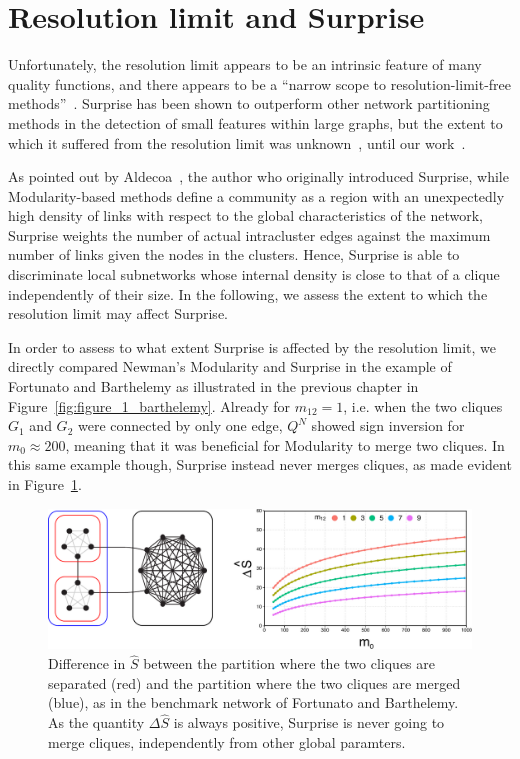 \section{Resolution limit and Surprise}
Unfortunately, the resolution limit appears to be an intrinsic feature of many quality functions, and there appears to be a ``narrow scope to resolution-limit-free methods''~\cite{traag2015}.  
Surprise has been shown to outperform other network partitioning methods in the detection of small features within large graphs, but the extent to which it suffered from the resolution limit was unknown~\cite{aldecoa2011,aldecoa2013}, until our work~\cite{nicolini2016}.

As pointed out by Aldecoa~\cite{aldecoa2011}, the author who originally introduced Surprise, while Modularity-based methods define a community as a region with an unexpectedly high density of links with respect to the global characteristics of the network, Surprise weights the number of actual intracluster edges against the maximum number of links given the nodes in the clusters.
Hence, Surprise is able to discriminate local subnetworks whose internal density is close to that of a clique independently of their size.
In the following, we assess the extent to which the resolution limit may affect Surprise.

In order to assess to what extent Surprise is affected by the resolution limit, we directly compared Newman's Modularity and Surprise in the example of Fortunato and Barthelemy as illustrated in the previous chapter in Figure~\ref{fig:figure_1_barthelemy}. Already for $m_{12} = 1$, i.e. when the two cliques $G_1$ and $G_2$ were connected by only one edge, $Q^N$ showed sign inversion for $m_0 \approx 200$, meaning that it was beneficial for Modularity to merge two cliques.
In this same example though, Surprise instead never merges cliques, as made evident in Figure~\ref{fig:barthelemy_surprise}.

\begin{figure}[htb!]
\centering
\includegraphics[width=1.0\textwidth]{images/barthelemy_surprise.pdf}
\caption{Difference in $\hat{S}$ between the partition where the two cliques are separated (red) and the partition where the two cliques are merged (blue), as in the benchmark network of Fortunato and Barthelemy. As the quantity $\Delta \hat{S}$ is always positive, Surprise is never going to merge cliques, independently from other global paramters.}
\label{fig:barthelemy_surprise}
\end{figure}


